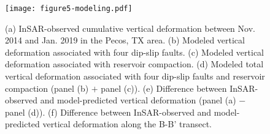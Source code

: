 \documentclass[draft]{agujournal2019}
\begin{document}
\begin{figure}[hbt!]
\centering
\texttt{[image: figure5-modeling.pdf]}
\caption{(a) InSAR-observed cumulative vertical deformation between Nov. 2014 and Jan. 2019 in the Pecos, TX area. (b) Modeled vertical deformation associated with four dip-slip faults. (c) Modeled vertical deformation associated with reservoir compaction. (d) Modeled total vertical deformation associated with four dip-slip faults and reservoir compaction (panel (b) $+$ panel (c)). (e) Difference between InSAR-observed and model-predicted vertical deformation (panel (a) $-$ panel (d)). (f) Difference between InSAR-observed and model-predicted vertical deformation along the B-B' transect.}
\label{fig:model}
\end{figure}
\end{document}

